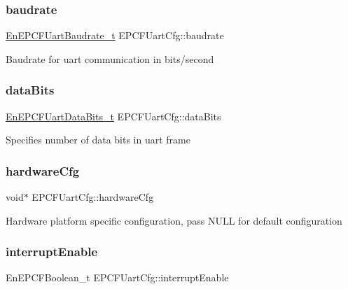 \subsubsection{\texorpdfstring{baudrate}{baudrate}}
{\footnotesize\ttfamily \mbox{\hyperlink{uart_8h_a24fb18401ffd9130c23a2cfe3bce15ad}{En\+E\+P\+C\+F\+Uart\+Baudrate\+\_\+t}} E\+P\+C\+F\+Uart\+Cfg\+::baudrate}

Baudrate for uart communication in bits/second \mbox{\label{structEPCFUartCfg_a04a5e975552aa93fbf5ee1142c994498}} 
\subsubsection{\texorpdfstring{data\+Bits}{dataBits}}
{\footnotesize\ttfamily \mbox{\hyperlink{uart_8h_a516fed66490995cacbaac89afadb3faf}{En\+E\+P\+C\+F\+Uart\+Data\+Bits\+\_\+t}} E\+P\+C\+F\+Uart\+Cfg\+::data\+Bits}

Specifies number of data bits in uart frame \mbox{\label{structEPCFUartCfg_adb1ead8cb827ec9e7c9ebe52d777e6a0}} 
\subsubsection{\texorpdfstring{hardware\+Cfg}{hardwareCfg}}
{\footnotesize\ttfamily void$\ast$ E\+P\+C\+F\+Uart\+Cfg\+::hardware\+Cfg}

Hardware platform specific configuration, pass N\+U\+LL for default configuration \mbox{\label{structEPCFUartCfg_a46be619c0ace09e5f81dc82923693556}} 
\subsubsection{\texorpdfstring{interrupt\+Enable}{interruptEnable}}
{\footnotesize\ttfamily En\+E\+P\+C\+F\+Boolean\+\_\+t E\+P\+C\+F\+Uart\+Cfg\+::interrupt\+Enable}

